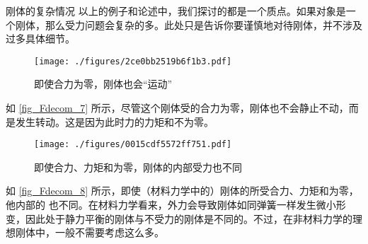 \begin{example}{刚体的复杂情况}
以上的例子和论述中，我们探讨的都是一个质点。如果对象是一个刚体，那么受力问题会复杂的多。此处只是告诉你要谨慎地对待刚体，并不涉及过多具体细节。

\begin{figure}[ht]
\centering
\texttt{[image: ./figures/2ce0bb2519b6f1b3.pdf]}
\caption{即使合力为零，刚体也会“运动”} \label{fig_Fdecom_7}
\end{figure}
如 \autoref{fig_Fdecom_7} 所示，尽管这个刚体受的合力为零，刚体也不会静止不动，而是发生转动。这是因为此时力的力矩和不为零。

\begin{figure}[ht]
\centering
\texttt{[image: ./figures/0015cdf5572ff751.pdf]}
\caption{即使合力、力矩和为零，刚体的内部受力也不同} \label{fig_Fdecom_8}
\end{figure}
如 \autoref{fig_Fdecom_8}  所示，即使（材料力学中的）刚体的所受合力、力矩和为零，他内部的 也不同。在材料力学看来，外力会导致刚体如同弹簧一样发生微小形变，因此处于静力平衡的刚体与不受力的刚体是不同的。不过，在非材料力学的理想刚体中，一般不需要考虑这么多。
\end{example}

